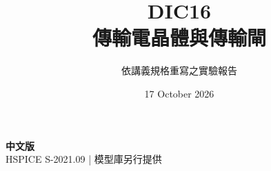 \documentclass[11pt,a4paper]{article}
\title{\color{accent}DIC16\\[4pt]傳輸電晶體與傳輸閘}
\author{依講義規格重寫之實驗報告}
\date{17 October 2026}
\begin{document}
\maketitle
\begin{center}\small\textbf{中文版}\\
HSPICE S-2021.09 \quad | \quad 模型庫另行提供
\end{center}


\end{document}
